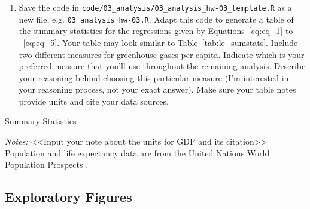 \begin{enumerate}
    \item Save the code in \verb+code/03_analysis/03_analysis_hw-03_template.R+ as a new file, e.g. \verb+03_analysis_hw-03.R+. Adapt this code to generate a table of the summary statistics for the regressions given by Equations~\ref{eq:eq_1} to ~\ref{eq:eq_5}. Your table may look similar to Table~\ref{tab:le_sumstats}. Include two different measures for greenhouse gases per capita. Indicate which is your preferred measure that you'll use throughout the remaining analysis. Describe your reasoning behind choosing this particular measure (I'm interested in your reasoning process, not your exact answer). Make sure your table notes provide units and cite your data sources.
\end{enumerate}



\begin{table}[H]
\centering
\caption{Summary Statistics}
\footnotesize
{
\def\sym#1{\ifmmode^{#1}\else\(^{#1}\)\fi}
\begin{threeparttable}



  \begin{tablenotes}
    \item \emph{Notes:} <<Input your note about the units for GDP and its citation>> Population and life expectancy data are from the United Nations World Population Prospects \citep{undesaWorldPopulationProspects2022}.
  \end{tablenotes}

\end{threeparttable}
}
\label{tab:le_sumstats}
\end{table}

\subsection{Exploratory Figures}\label{sec:figures}

